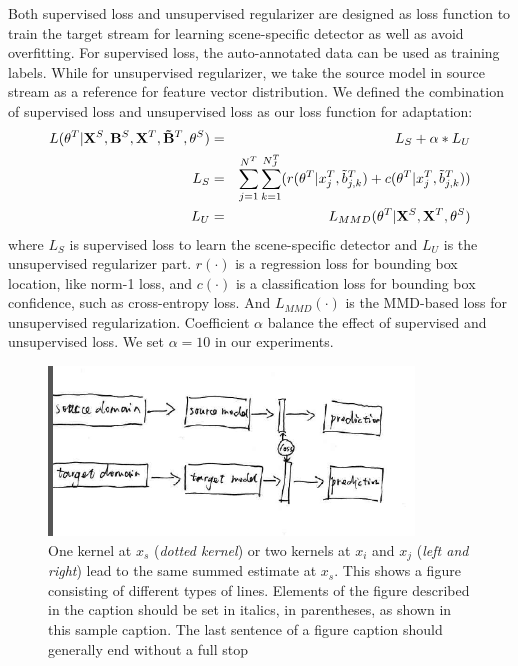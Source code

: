 \documentclass[runningheads]{llncs}
\begin{document}
Both supervised loss and unsupervised regularizer are designed as loss function to train the target stream for learning scene-specific detector as well as avoid overfitting. For supervised loss, the auto-annotated data can be used as training labels. While for unsupervised regularizer, we take the source model in source stream as a reference for feature vector distribution. We defined the combination of supervised loss and unsupervised loss as our loss function for adaptation:
\begin{eqnarray}
  L(\theta^{T}|{\bf X}^{S},{\bf B}^{S},{\bf X}^{T},{\bf \tilde{B}}^{T},\theta^{S}) &=& L_{S} + \alpha * L_{U} \\
  L_{S} &=&  \sum^{N^{T}}_{j=1}{\sum^{N^{T}_{J}}_{k=1}( r(\theta^{T}|x^{T}_{j},\tilde{b}^{T}_{j,k})+c(\theta^{T}|x^{T}_{j},\tilde{b}^{T}_{j,k}) )} \\
  L_{U} &=& L_{MMD}(\theta^{T}|{\bf X}^{S},{\bf X}^{T},\theta^{S})
\end{eqnarray}
where $L_{S}$ is supervised loss to learn the scene-specific detector and $L_{U}$ is the unsupervised regularizer part. $r(\cdot)$ is a regression loss for bounding box location, like norm-1 loss, and $c(\cdot)$ is a classification loss for bounding box confidence, such as cross-entropy loss. And $L_{MMD}(\cdot)$ is the MMD-based loss for unsupervised regularization. Coefficient $\alpha$ balance the effect of supervised and unsupervised loss. We set $\alpha = 10$ in our experiments.

\begin{figure}
\centering
\includegraphics[height=4.5cm]{images/streams.png}
\caption{One kernel at $x_s$ ({\it dotted kernel}) or two kernels at
$x_i$ and $x_j$ ({\it left and right}) lead to the same summed estimate
at $x_s$. This shows a figure consisting of different types of
lines. Elements of the figure described in the caption should be set in
italics,
in parentheses, as shown in this sample caption. The last
sentence of a figure caption should generally end without a full stop}
\label{fig:example}
\end{figure}
\end{document}
